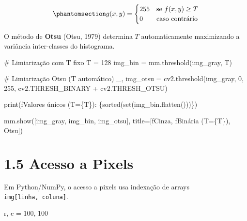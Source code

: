 \documentclass[
  portuguese,
  letterpaper,
  openany,
  oneside,
  12pt,
  a4paper]{book}
\newenvironment{Shaded}{\begin{snugshade}}{\end{snugshade}}
\newcommand{\BuiltInTok}[1]{\textcolor[rgb]{0.00,0.23,0.31}{#1}}
\newcommand{\CommentTok}[1]{\textcolor[rgb]{0.37,0.37,0.37}{#1}}
\newcommand{\DecValTok}[1]{\textcolor[rgb]{0.68,0.00,0.00}{#1}}
\newcommand{\NormalTok}[1]{\textcolor[rgb]{0.00,0.23,0.31}{#1}}
\newcommand{\OperatorTok}[1]{\textcolor[rgb]{0.37,0.37,0.37}{#1}}
\newcommand{\SpecialCharTok}[1]{\textcolor[rgb]{0.37,0.37,0.37}{#1}}
\newcommand{\SpecialStringTok}[1]{\textcolor[rgb]{0.13,0.47,0.30}{#1}}
\newcommand{\StringTok}[1]{\textcolor[rgb]{0.13,0.47,0.30}{#1}}
\begin{document}
\begin{tcolorbox}
\begin{equation}\phantomsection\label{eq-1-limiar}{g(x,y) = \begin{cases} 255 & \text{se } f(x,y) \geq T \\ 0 & \text{caso contrário} \end{cases}}\end{equation}

O método de \textbf{Otsu} (Otsu, 1979) determina \(T\) automaticamente
maximizando a variância inter-classes do histograma.

\begin{Shaded}
\begin{Highlighting}[]
\CommentTok{\# Limiarização com T fixo}
\NormalTok{T }\OperatorTok{=} \DecValTok{128}
\NormalTok{img\_bin }\OperatorTok{=}\NormalTok{ mm.threshold(img\_gray, T)}

\CommentTok{\# Limiarização Otsu (T automático)}
\NormalTok{\_, img\_otsu }\OperatorTok{=}\NormalTok{ cv2.threshold(img\_gray, }\DecValTok{0}\NormalTok{, }\DecValTok{255}\NormalTok{,}
\NormalTok{                             cv2.THRESH\_BINARY }\OperatorTok{+}\NormalTok{ cv2.THRESH\_OTSU)}

\BuiltInTok{print}\NormalTok{(}\SpecialStringTok{f\textquotesingle{}Valores únicos (T=}\SpecialCharTok{\{}\NormalTok{T}\SpecialCharTok{\}}\SpecialStringTok{): }\SpecialCharTok{\{}\BuiltInTok{sorted}\NormalTok{(}\BuiltInTok{set}\NormalTok{(img\_bin.flatten()))}\SpecialCharTok{\}}\SpecialStringTok{\textquotesingle{}}\NormalTok{)}

\NormalTok{mm.show([img\_gray, img\_bin, img\_otsu],}
\NormalTok{        title}\OperatorTok{=}\NormalTok{[}\SpecialStringTok{f\textquotesingle{}Cinza\textquotesingle{}}\NormalTok{, }\SpecialStringTok{f\textquotesingle{}Binária (T=}\SpecialCharTok{\{}\NormalTok{T}\SpecialCharTok{\}}\SpecialStringTok{)\textquotesingle{}}\NormalTok{, }\StringTok{\textquotesingle{}Otsu\textquotesingle{}}\NormalTok{])}
\end{Highlighting}
\end{Shaded}

\section{1.5 Acesso a Pixels}\label{acesso-a-pixels-1}

Em Python/NumPy, o acesso a pixels usa indexação de arrays
\texttt{img{[}linha,\ coluna{]}}.

\begin{Shaded}
\begin{Highlighting}[]
\NormalTok{r, c }\OperatorTok{=} \DecValTok{100}\NormalTok{, }\DecValTok{100}


\end{Highlighting}
\end{Shaded}
\end{tcolorbox}
\end{document}
